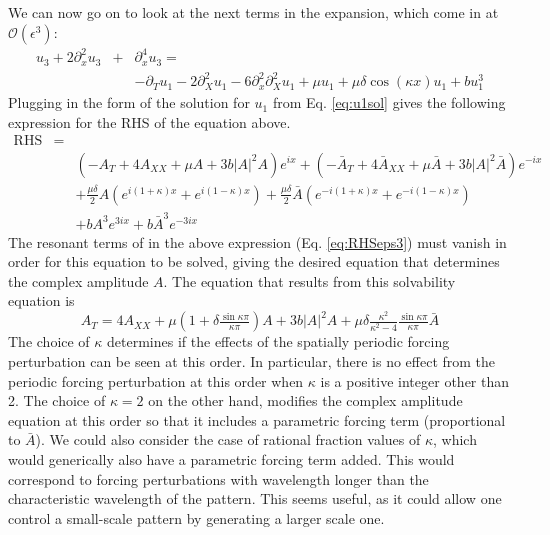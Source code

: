 \documentclass[api,pof,pre,12pt,a4paper]{revtex4-1}
\begin{document}
We can now go on to look at the next terms in the expansion, which come in at $\mathcal{O}(\epsilon^3)$:
\begin{eqnarray}
u_3+2\partial_x^2 u_3 &+& \partial_x^4 u_3 =  \nonumber \\
& & -\partial_T u_1-2\partial_X^2 u_1 - 6\partial_x^2 \partial_X^2 u_1 +\mu u_1 +\mu \delta \cos(\kappa x)  u_1 +b u_1^3
\label{eq:AsympExpEps3}
\end{eqnarray}
Plugging in the form of the solution for $u_1$ from Eq. \ref{eq:u1sol} gives the following expression for the RHS of the equation above.
\begin{eqnarray}
\text{RHS}&=&  \nonumber \\ 
& &\left(-A_T  +4 A_{XX}+\mu A + 3b |A|^2 A\right)e^{ix} + \left(-\bar{A}_T +4 \bar{A}_{XX}+\mu \bar{A} + 3b |A|^2 \bar{A}\right)e^{-ix} \nonumber \\
& &+\frac{\mu\delta}{2} A\left(e^{i(1+\kappa)x}+e^{i(1-\kappa)x} \right) + \frac{\mu\delta}{2} \bar{A}\left( e^{-i(1+\kappa)x}+e^{-i(1-\kappa)x} \right) \nonumber \\
& & +bA^3e^{3ix}+b\bar{A}^3e^{-3ix}
\label{eq:RHSeps3}
\end{eqnarray}
The resonant terms of in the above expression (Eq. \ref{eq:RHSeps3}) must vanish in order for this equation to be solved, giving the desired equation that determines the complex amplitude $A$.  The equation that results from this solvability equation is
\begin{equation}
A_T= 4 A_{XX}+\mu\left(1+\delta \tfrac{\sin\kappa \pi}{\kappa\pi}\right) A + 3b |A|^2 A+\mu\delta\tfrac{\kappa^2}{\kappa^2-4}\tfrac{\sin\kappa\pi}{\kappa\pi}\bar{A}
\label{eq:Aeq}
\end{equation}
The choice of $\kappa$ determines if the effects of the spatially periodic forcing perturbation can be seen at this order.  In particular, there is no effect from the periodic forcing perturbation at this order when $\kappa$ is a positive integer other than 2.  The choice of $\kappa=2$ on the other hand, modifies the complex amplitude equation at this order so that it includes a parametric forcing term (proportional to $\bar{A}$).  We could also consider the case of rational fraction values of $\kappa$, which would generically also have a parametric forcing term added.  This would correspond to forcing perturbations with wavelength longer than the characteristic wavelength of the pattern. This seems useful, as it could allow one control a small-scale pattern by generating a larger scale one.  
\end{document}
